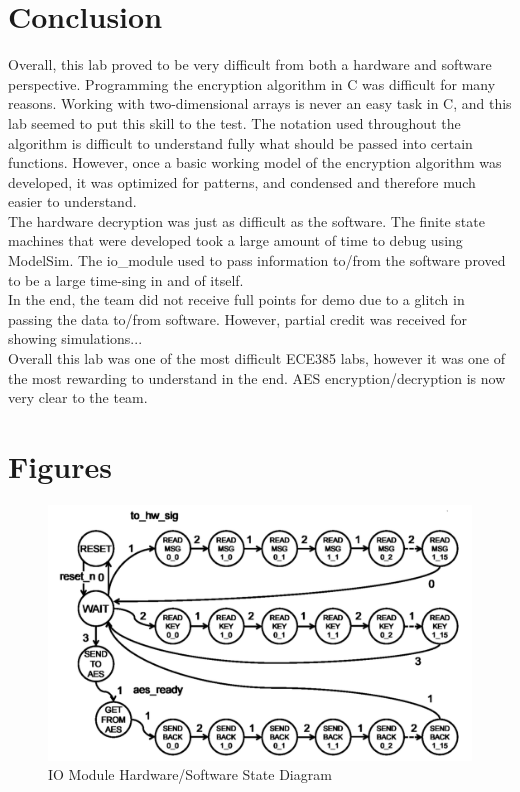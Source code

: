 \documentclass[journal, twocolumn, final,11pt,letterpaper]{IEEEtran}
\begin{document}
\section{Conclusion}
Overall, this lab proved to be very difficult from both a hardware and software perspective. Programming the encryption algorithm in C was difficult for many reasons. Working with two-dimensional arrays is never an easy task in C, and this lab seemed to put this skill to the test. The notation used throughout the algorithm is difficult to understand fully what should be passed into certain functions. However, once a basic working model of the encryption algorithm was developed, it was optimized for patterns, and condensed and therefore much easier to understand. \\

The hardware decryption was just as difficult as the software. The finite state machines that were developed took a large amount of time to debug using ModelSim. The io\_module used to pass information to/from the software proved to be a large time-sing in and of itself. \\

In the end, the team did not receive full points for demo due to a glitch in passing the data to/from software. However, partial credit was received for showing simulations...\\

Overall this lab was one of the most difficult ECE385 labs, however it was one of the most rewarding to understand in the end. AES encryption/decryption is now very clear to the team.

\clearpage
\onecolumn
\section{Figures}


\begin{figure} [H]
	\centering
	\includegraphics[scale=.6]{IO_Module_State_Diagram.png}
	\caption{IO Module Hardware/Software State Diagram\label{fig:io-module}}
\end{figure}  
\end{document}
